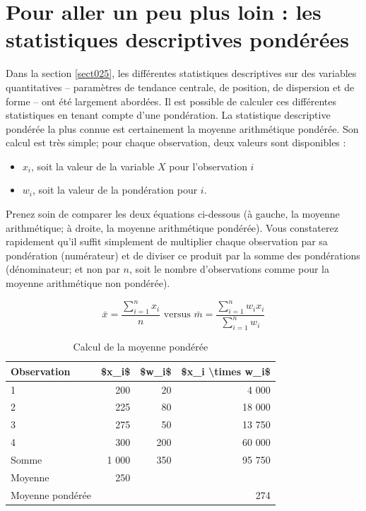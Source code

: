 \documentclass[
  11pt,
  french,
]{book}
\providecommand{\tightlist}{%
  \setlength{\itemsep}{0pt}\setlength{\parskip}{0pt}}
\begin{document}
\hypertarget{sect027}{%
\section{Pour aller un peu plus loin : les statistiques descriptives pondérées}\label{sect027}}

Dans la section \ref{sect025}, les différentes statistiques descriptives sur des variables quantitatives -- paramètres de tendance centrale, de position, de dispersion et de forme -- ont été largement abordées. Il est possible de calculer ces différentes statistiques en tenant compte d'une pondération. La statistique descriptive pondérée la plus connue est certainement la moyenne arithmétique pondérée. Son calcul est très simple; pour chaque observation, deux valeurs sont disponibles :

\begin{itemize}
\tightlist
\item
  \(x_i\), soit la valeur de la variable \(X\) pour l'observation \(i\)
\item
  \(w_i\), soit la valeur de la pondération pour \(i\).
\end{itemize}

Prenez soin de comparer les deux équations ci-dessous (à gauche, la moyenne arithmétique; à droite, la moyenne arithmétique pondérée). Vous constaterez rapidement qu'il suffit simplement de multiplier chaque observation par sa pondération (numérateur) et de diviser ce produit par la somme des pondérations (dénominateur; et non par \(n\), soit le nombre d'observations comme pour la moyenne arithmétique non pondérée).

\begin{equation} 
\bar{x}=\frac{\sum_{i=1}^n x_i}{n} \text { versus } \bar{m}=\frac{\sum_{i=1}^n  w_ix_i}{\sum_{i=1}^nw_i}
\label{eq:moypond}
\end{equation}

\begin{table}

\caption{\label{tab:MoyPondCalcul}Calcul de la moyenne pondérée}
\centering
\fontsize{8}{10}\selectfont
\begin{tabular}[t]{lrrr}
\toprule
Observation & \$x\_i\$ & \$w\_i\$ & \$x\_i \textbackslash{}times w\_i\$\\
\midrule
1 & 200 & 20 & 4 000\\
2 & 225 & 80 & 18 000\\
3 & 275 & 50 & 13 750\\
4 & 300 & 200 & 60 000\\
Somme & 1 000 & 350 & 95 750\\
\addlinespace
Moyenne & 250 &  & \\
Moyenne pondérée &  &  & 274\\
\bottomrule
\end{tabular}
\end{table}
\end{document}
